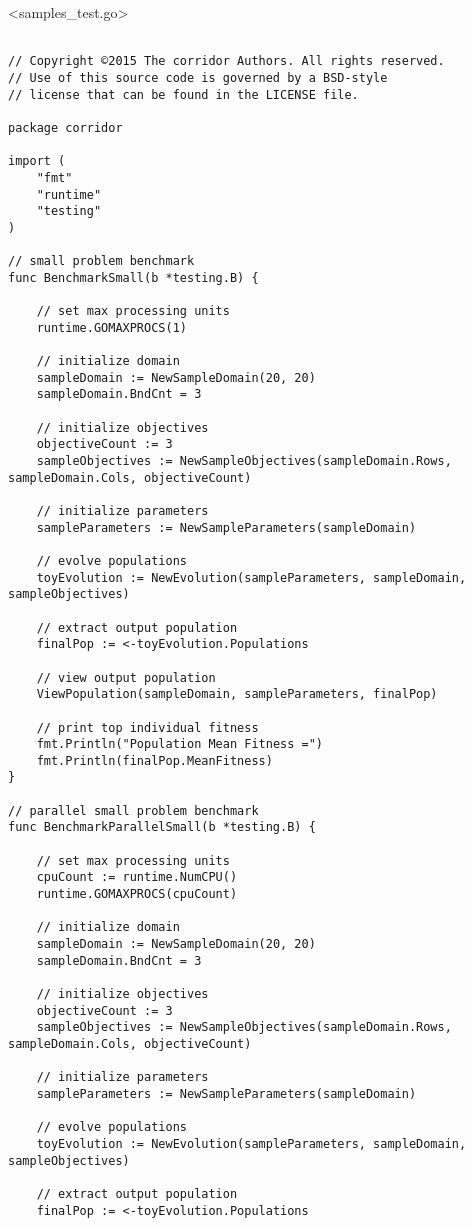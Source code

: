 \newpage

<samples\_test.go>

\begin{lstlisting}[basicstyle=\tiny]

// Copyright ©2015 The corridor Authors. All rights reserved.
// Use of this source code is governed by a BSD-style
// license that can be found in the LICENSE file.

package corridor

import (
	"fmt"
	"runtime"
	"testing"
)

// small problem benchmark
func BenchmarkSmall(b *testing.B) {

	// set max processing units
	runtime.GOMAXPROCS(1)

	// initialize domain
	sampleDomain := NewSampleDomain(20, 20)
	sampleDomain.BndCnt = 3

	// initialize objectives
	objectiveCount := 3
	sampleObjectives := NewSampleObjectives(sampleDomain.Rows, sampleDomain.Cols, objectiveCount)

	// initialize parameters
	sampleParameters := NewSampleParameters(sampleDomain)

	// evolve populations
	toyEvolution := NewEvolution(sampleParameters, sampleDomain, sampleObjectives)

	// extract output population
	finalPop := <-toyEvolution.Populations

	// view output population
	ViewPopulation(sampleDomain, sampleParameters, finalPop)

	// print top individual fitness
	fmt.Println("Population Mean Fitness =")
	fmt.Println(finalPop.MeanFitness)
}

// parallel small problem benchmark
func BenchmarkParallelSmall(b *testing.B) {

	// set max processing units
	cpuCount := runtime.NumCPU()
	runtime.GOMAXPROCS(cpuCount)

	// initialize domain
	sampleDomain := NewSampleDomain(20, 20)
	sampleDomain.BndCnt = 3

	// initialize objectives
	objectiveCount := 3
	sampleObjectives := NewSampleObjectives(sampleDomain.Rows, sampleDomain.Cols, objectiveCount)

	// initialize parameters
	sampleParameters := NewSampleParameters(sampleDomain)

	// evolve populations
	toyEvolution := NewEvolution(sampleParameters, sampleDomain, sampleObjectives)

	// extract output population
	finalPop := <-toyEvolution.Populations


\end{lstlisting}
